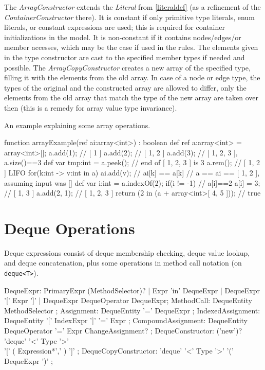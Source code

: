 The \emph{ArrayConstructor} extends the \emph{Literal} from \ref{literaldef} (as a refinement of the \emph{ContainerConstructor} there).
It is constant if only primitive type literals, enum literals, or constant expressions are used; this is required for container initializations in the model.
It is non-constant if it contains nodes/edges/or member accesses, which may be the case if used in the rules.
The elements given in the type constructor are cast to the specified member types if needed and possible.
The \emph{ArrayCopyConstructor} creates a new array of the specified type, filling it with the elements from the old array. 
In case of a node or edge type, the types of the original and the constructed array are allowed to differ, 
only the elements from the old array that match the type of the new array are taken over then (this is a remedy for array value type invariance).

\begin{example}
An example explaining some array operations.
\begin{grgen}
function arrayExample(ref ai:array<int>) : boolean
{
	def ref a:array<int> = array<int>[];
	a.add(1); // [ 1 ]
	a.add(2); // [ 1, 2 ]
	a.add(3); // [ 1, 2, 3 ], a.size()==3
	def var tmp:int = a.peek(); // end of [ 1, 2, 3 ] is 3 
	a.rem(); // [ 1, 2 ] LIFO
	for(k:int -> v:int in a) {
		ai.add(v); // ai[k] == a[k]
	} // a == ai == [ 1, 2 ], assuming input was []
	def var i:int = a.indexOf(2);
	if(i != -1) { // a[i]==2
		a[i] = 3;
	} // [ 1, 3 ]
	a.add(2, 1); // [ 1, 2, 3 ]
	return (2 in (a + array<int>[ 4, 5 ])); // true
}
\end{grgen}
\end{example}


\section{Deque Operations} \label{sec:dequeexpr}

Deque expressions consist of deque membership checking, deque value lookup, and deque concatenation, plus some operations in method call notation (on \texttt{deque<T>}).

\begin{rail}
  DequeExpr: PrimaryExpr (MethodSelector)? | Expr 'in' DequeExpr | DequeExpr '[' Expr ']' | DequeExpr DequeOperator DequeExpr;
  MethodCall: DequeEntity MethodSelector ;
  Assignment: DequeEntity '=' DequeExpr ;
  IndexedAssignment: DequeEntity '[' IndexExpr ']' '=' Expr ;
  CompoundAssignment: DequeEntity DequeOperator '=' Expr ChangeAssignment? ;
  DequeConstructor: ('new')? 'deque' '<' Type '>' \\ '[' ( Expression*',' ) ']' ;
  DequeCopyConstructor: 'deque' '<' Type '>' '(' DequeExpr ')' ;
\end{rail}

